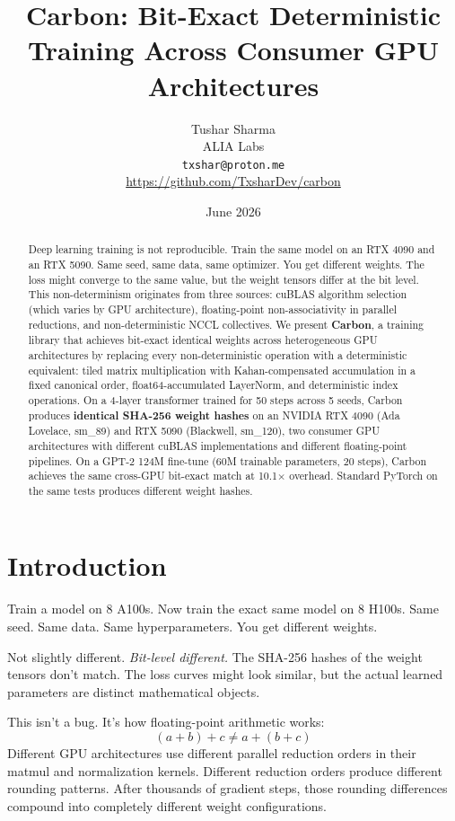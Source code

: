 \documentclass[11pt,a4paper]{article}
\title{Carbon: Bit-Exact Deterministic Training Across Consumer GPU Architectures}
\author{
  Tushar Sharma \\
  ALIA Labs \\
  \texttt{txshar@proton.me} \\
  \url{https://github.com/TxsharDev/carbon}
}
\date{June 2026}
\begin{document}
\maketitle

\begin{abstract}
Deep learning training is not reproducible. Train the same model on an RTX 4090
and an RTX 5090. Same seed, same data, same optimizer. You get different
weights. The loss might converge to the same value, but the weight tensors differ
at the bit level. This non-determinism originates from three sources: cuBLAS
algorithm selection (which varies by GPU architecture), floating-point
non-associativity in parallel reductions, and non-deterministic NCCL collectives.
We present \textbf{Carbon}, a training library that achieves bit-exact identical
weights across heterogeneous GPU architectures by replacing every
non-deterministic operation with a deterministic equivalent: tiled matrix
multiplication with Kahan-compensated accumulation in a fixed canonical order,
float64-accumulated LayerNorm, and deterministic index operations.
On a 4-layer transformer trained for 50 steps across 5 seeds, Carbon produces
\textbf{identical SHA-256 weight hashes}
on an NVIDIA RTX 4090 (Ada Lovelace, sm\_89) and RTX 5090 (Blackwell, sm\_120), two
consumer GPU architectures with different cuBLAS implementations and different
floating-point pipelines. On a GPT-2 124M fine-tune (60M trainable parameters,
20 steps), Carbon achieves the same cross-GPU bit-exact match at 10.1$\times$
overhead. Standard PyTorch on the same tests produces different weight hashes.
\end{abstract}

\section{Introduction}

Train a model on 8 A100s. Now train the exact same model on 8 H100s. Same seed.
Same data. Same hyperparameters. You get different weights.

Not slightly different. \emph{Bit-level different.} The SHA-256 hashes of the
weight tensors don't match. The loss curves might look similar, but the
actual learned parameters are distinct mathematical objects.

This isn't a bug. It's how floating-point arithmetic works:
\begin{equation}
  (a + b) + c \neq a + (b + c)
\end{equation}
Different GPU architectures use different parallel reduction orders in their
matmul and normalization kernels. Different reduction orders produce different
rounding patterns. After thousands of gradient steps, those rounding differences
compound into completely different weight configurations.
\end{document}
